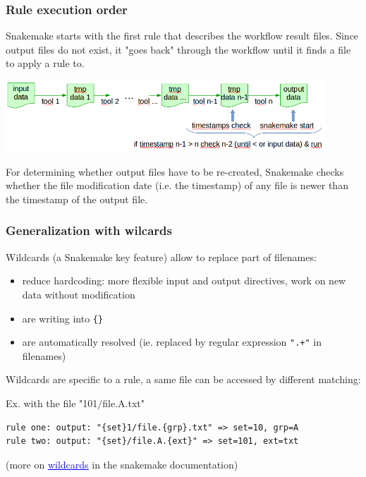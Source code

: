 \begin{frame}[containsverbatim]
\frametitle{Rule execution order}
Snakemake starts with the first rule that describes the workflow result files. Since output files do not exist, it "goes back" through the workflow until it finds a file to apply a rule to. 
\begin{center}
    \includegraphics[width=12cm]{03_workflow/images/FAIR_smk_wf_timestamps.png}
\end{center}
For determining whether output files have to be re-created, Snakemake checks whether the file modification date (i.e. the timestamp) of any file is newer than the timestamp of the output file.
\end{frame}
\begin{frame}[containsverbatim]
\frametitle{Generalization with wilcards}
Wildcards (a Snakemake key feature) allow to replace part of filenames:
\begin{itemize}
    \item reduce hardcoding: more flexible input and output directives, work on new data without modification
    \item are writing into \verb|{}| 
    \item are automatically resolved (ie. replaced by regular expression \verb|".+"| in filenames)
\end{itemize}
Wildcards are specific to a rule, a same file can be accessed by different matching:
\begin{block}{Ex. with the file "101$/$file.A.txt"}
\begin{lstlisting}
rule one: output: "{set}1/file.{grp}.txt" => set=10, grp=A
rule two: output: "{set}/file.A.{ext}" => set=101, ext=txt
\end{lstlisting}
\end{block}
\vfill
(more on \href{https://snakemake.readthedocs.io/en/stable/snakefiles/rules.html#wildcards}{\textcolor{blue}{\underline{wildcards}}} in the snakemake documentation)
\end{frame}
